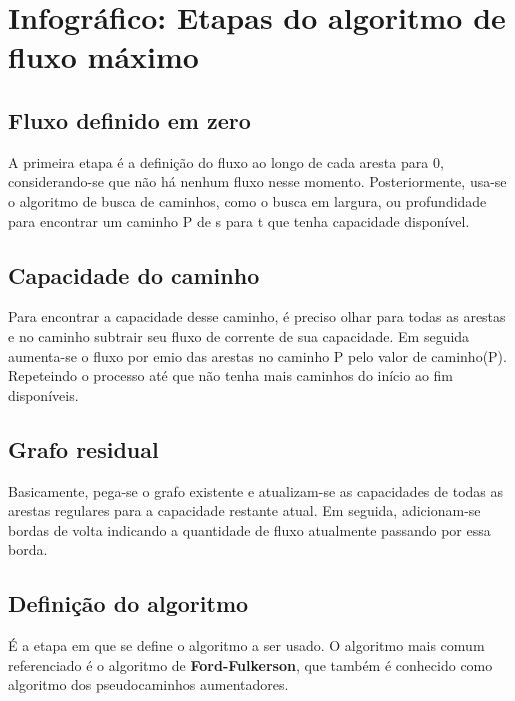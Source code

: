 \documentclass[12pt, a4paper]{paper}
\author{João Vitor Rezende Moura}
\begin{document}
\section{Infográfico: Etapas do algoritmo de fluxo máximo} %
\label{sec:Infográfico: Etapas do algoritmo de fluxo máximo}

\subsection{Fluxo definido em zero} %
\label{sub:Fluxo definido em zero}
A primeira etapa é a definição do fluxo ao longo de cada aresta para 0, considerando-se 
que não há nenhum fluxo nesse momento. Posteriormente, usa-se o algoritmo de busca de 
caminhos, como o busca em largura, ou profundidade para encontrar um caminho P de s para 
t que tenha capacidade disponível.

\subsection{Capacidade do caminho} %
\label{sub:Capacidade do caminho}
Para encontrar a capacidade desse caminho, é preciso olhar para todas as arestas e no 
caminho subtrair seu fluxo de corrente de sua capacidade. Em seguida aumenta-se o fluxo 
por emio das arestas no caminho P pelo valor de caminho(P). Repeteindo o processo até 
que não tenha mais caminhos do início ao fim disponíveis.

\subsection{Grafo residual} %
\label{sub:Grafo residual}
Basicamente, pega-se o grafo existente e atualizam-se as capacidades de todas as arestas
regulares para a capacidade restante atual. Em seguida, adicionam-se bordas de volta 
indicando a quantidade de fluxo atualmente passando por essa borda.

\subsection{Definição do algoritmo} %
\label{sub:Definição do algoritmo}
É a etapa em que se define o algoritmo a ser usado. O algoritmo mais comum referenciado
é o algoritmo de \textbf{Ford-Fulkerson}, que também é conhecido como algoritmo dos 
pseudocaminhos aumentadores.
\newpage
\end{document}
